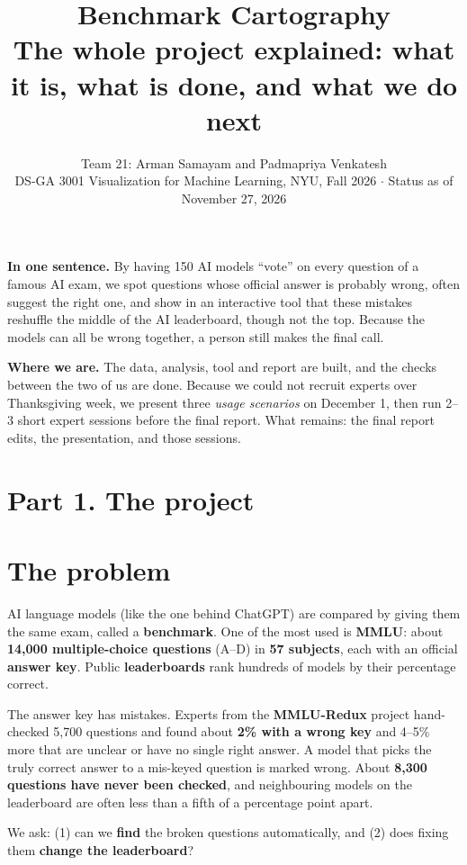 \documentclass[11pt]{article}
\title{\textbf{Benchmark Cartography}\\[2pt]
\large The whole project explained: what it is, what is done, and what we do next}
\author{Team 21: Arman Samayam and Padmapriya Venkatesh\\
\small DS-GA 3001 Visualization for Machine Learning, NYU, Fall 2026 $\cdot$ Status as of November 27, 2026}
\date{}
\newcommand{\keybox}[1]{\par\smallskip\noindent\colorbox{boxbg}{\parbox{\dimexpr\linewidth-2\fboxsep}{\vspace{3pt}#1\vspace{3pt}}}\par\smallskip}
\begin{document}
\maketitle
\vspace{-2em}

\keybox{\textbf{In one sentence.} By having 150 AI models ``vote'' on every question of a famous AI
exam, we spot questions whose official answer is probably wrong, often suggest the right one, and
show in an interactive tool that these mistakes reshuffle the middle of the AI leaderboard, though
not the top. Because the models can all be wrong together, a person still makes the final call.

\smallskip
\textbf{Where we are.} The data, analysis, tool and report are built, and the checks between the two
of us are done. Because we could not recruit experts over Thanksgiving week, we present three
\emph{usage scenarios} on December 1, then run 2--3 short expert sessions before the final
report. What remains: the final report edits, the presentation, and those sessions.}

\section*{Part 1. The project}

\section{The problem}

AI language models (like the one behind ChatGPT) are compared by giving them the same exam, called a
\textbf{benchmark}. One of the most used is \textbf{MMLU}: about \textbf{14,000 multiple-choice
questions} (A--D) in \textbf{57 subjects}, each with an official \textbf{answer key}. Public
\textbf{leaderboards} rank hundreds of models by their percentage correct.

The answer key has mistakes. Experts from the \textbf{MMLU-Redux} project hand-checked 5,700 questions
and found about \textbf{2\% with a wrong key} and 4--5\% more that are unclear or have no single right
answer. A model that picks the truly correct answer to a mis-keyed question is marked wrong. About
\textbf{8,300 questions have never been checked}, and neighbouring models on the leaderboard are often
less than a fifth of a percentage point apart.

We ask: (1) can we \textbf{find} the broken questions automatically, and (2) does fixing them
\textbf{change the leaderboard}?
\end{document}
